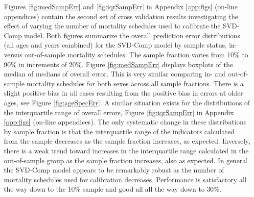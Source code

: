 \documentclass[11pt]{article}
\begin{document}
Figures \ref{fig:medSampErr} and \ref{fig:iqrSampErr} in Appendix \ref{app:figs} (on-line appendices) contain the second set of cross validation results investigating the effect of varying the number of mortality schedules used to calibrate the SVD-Comp model.  Both figures summarize the overall prediction error distributions (all ages and years combined) for the SVD-Comp model by sample status, in- versus out-of-sample mortality schedules.  The sample fraction varies from 10\% to 90\% in increments of 20\%.   Figure \ref{fig:medSampErr} displays boxplots of the median of medians of overall error.  This is very similar comparing in- and out-of-sample mortality schedules for both sexes across all sample fractions.  There is a slight positive bias in all cases resulting from the positive bias in errors at older ages, see Figure \ref{fig:ageSpecErr}.  A similar situation exists for the distributions of the interquartile range of overall errors, Figure \ref{fig:iqrSampErr} in Appendix \ref{app:figs} (on-line appendices).  The only systematic change in these distributions by sample fraction is that the interquartile range of the indicators calculated from the sample decreases as the sample fraction increases, as expected.  Inversely, there is a weak trend toward increases in the interquartile range calculated in the out-of-sample group as the sample fraction increases, also as expected.  In general the SVD-Comp model appears to be remarkably robust as the number of mortality schedules used for calibration decreases.  Performance is satisfactory all the way down to the 10\% sample and good all all the way down to 30\%.
\end{document}
